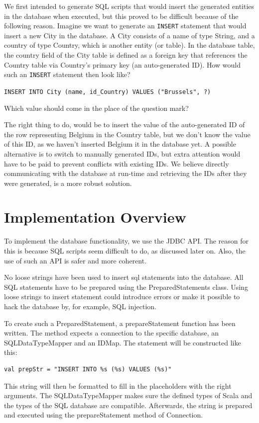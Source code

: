 \documentclass[a4paper]{article}
\newcommand{\cc}[1]{\texttt{#1}}
\begin{document}
We first intended to generate SQL scripts that would insert the generated entities in the database when executed, but this proved to be difficult because of the following reason.
Imagine we want to generate an \cc{INSERT} statement that would insert a new City in the database.
A City consists of a name of type String, and a country of type Country, which is another entity (or table).
In the database table, the country field of the City table is defined as a foreign key that references the Country table via Country's primary key (an auto-generated ID).
How would such an \cc{INSERT} statement then look like?

\cc{INSERT INTO City (name, id\_Country) VALUES ("Brussels", ?)}

Which value should come in the place of the question mark?

The right thing to do, would be to insert the value of the auto-generated ID of the row representing Belgium in the Country table, but we don't know the value of this ID, as we haven't inserted Belgium it in the database yet.
A possible alternative is to switch to manually generated IDs, but extra attention would have to be paid to prevent conflicts with existing IDs.
We believe directly communicating with the database at run-time and retrieving the IDs after they were generated, is a more robust solution.


\section{Implementation Overview}
\label{sec:implementation-overview}


To implement the database functionality, we use the JDBC API. 
The reason for this is because SQL scripts seem difficult to do, as discussed later on. %
Also, the use of such an API is safer and more coherent.

No loose strings have been used to insert sql statements into the database.
All SQL statements have to be prepared using the PreparedStatements class.
Using loose strings to insert statement could introduce errors or make it possible to hack the database by, for example, SQL injection.

To create such a PreparedStatement, a prepareStatement function has been written.
The method expects a connection to the specific database, an SQLDataTypeMapper and an IDMap.
The statement will be constructed like this:
\begin{verbatim}
val prepStr = "INSERT INTO %s (%s) VALUES (%s)"
\end{verbatim}
This string will then be formatted to fill in the placeholders with the right arguments.
The SQLDataTypeMapper makes sure the defined types of Scala and the types of the SQL database are compatible.
Afterwards, the string is prepared and executed using the prepareStatement method of Connection.
\end{document}

